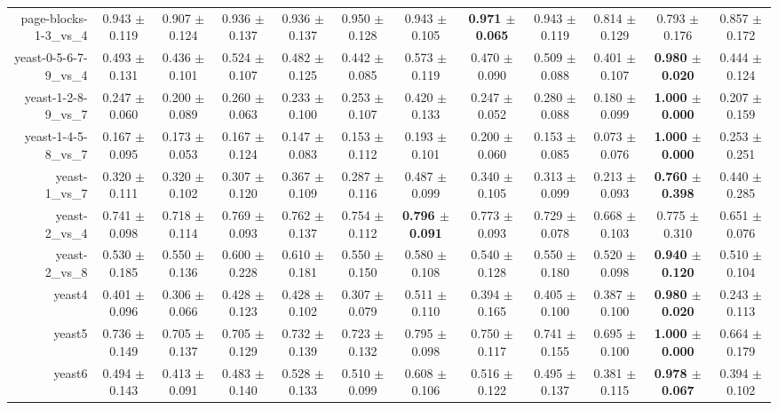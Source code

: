 \begin{table}[!ht]
{\begin{tabular}{r c c c c c c c c c c c}
page-blocks-1-3\_vs\_4 & 0.943 $\pm$ 0.119 & 0.907 $\pm$ 0.124 & 0.936 $\pm$ 0.137 & 0.936 $\pm$ 0.137 & 0.950 $\pm$ 0.128 & 0.943 $\pm$ 0.105 & \textbf{0.971 $\pm$ 0.065} & 0.943 $\pm$ 0.119 & 0.814 $\pm$ 0.129 & 0.793 $\pm$ 0.176 & 0.857 $\pm$ 0.172 \\
yeast-0-5-6-7-9\_vs\_4 & 0.493 $\pm$ 0.131 & 0.436 $\pm$ 0.101 & 0.524 $\pm$ 0.107 & 0.482 $\pm$ 0.125 & 0.442 $\pm$ 0.085 & 0.573 $\pm$ 0.119 & 0.470 $\pm$ 0.090 & 0.509 $\pm$ 0.088 & 0.401 $\pm$ 0.107 & \textbf{0.980 $\pm$ 0.020} & 0.444 $\pm$ 0.124 \\
yeast-1-2-8-9\_vs\_7 & 0.247 $\pm$ 0.060 & 0.200 $\pm$ 0.089 & 0.260 $\pm$ 0.063 & 0.233 $\pm$ 0.100 & 0.253 $\pm$ 0.107 & 0.420 $\pm$ 0.133 & 0.247 $\pm$ 0.052 & 0.280 $\pm$ 0.088 & 0.180 $\pm$ 0.099 & \textbf{1.000 $\pm$ 0.000} & 0.207 $\pm$ 0.159 \\
yeast-1-4-5-8\_vs\_7 & 0.167 $\pm$ 0.095 & 0.173 $\pm$ 0.053 & 0.167 $\pm$ 0.124 & 0.147 $\pm$ 0.083 & 0.153 $\pm$ 0.112 & 0.193 $\pm$ 0.101 & 0.200 $\pm$ 0.060 & 0.153 $\pm$ 0.085 & 0.073 $\pm$ 0.076 & \textbf{1.000 $\pm$ 0.000} & 0.253 $\pm$ 0.251 \\
yeast-1\_vs\_7 & 0.320 $\pm$ 0.111 & 0.320 $\pm$ 0.102 & 0.307 $\pm$ 0.120 & 0.367 $\pm$ 0.109 & 0.287 $\pm$ 0.116 & 0.487 $\pm$ 0.099 & 0.340 $\pm$ 0.105 & 0.313 $\pm$ 0.099 & 0.213 $\pm$ 0.093 & \textbf{0.760 $\pm$ 0.398} & 0.440 $\pm$ 0.285 \\
yeast-2\_vs\_4 & 0.741 $\pm$ 0.098 & 0.718 $\pm$ 0.114 & 0.769 $\pm$ 0.093 & 0.762 $\pm$ 0.137 & 0.754 $\pm$ 0.112 & \textbf{0.796 $\pm$ 0.091} & 0.773 $\pm$ 0.093 & 0.729 $\pm$ 0.078 & 0.668 $\pm$ 0.103 & 0.775 $\pm$ 0.310 & 0.651 $\pm$ 0.076 \\
yeast-2\_vs\_8 & 0.530 $\pm$ 0.185 & 0.550 $\pm$ 0.136 & 0.600 $\pm$ 0.228 & 0.610 $\pm$ 0.181 & 0.550 $\pm$ 0.150 & 0.580 $\pm$ 0.108 & 0.540 $\pm$ 0.128 & 0.550 $\pm$ 0.180 & 0.520 $\pm$ 0.098 & \textbf{0.940 $\pm$ 0.120} & 0.510 $\pm$ 0.104 \\
yeast4 & 0.401 $\pm$ 0.096 & 0.306 $\pm$ 0.066 & 0.428 $\pm$ 0.123 & 0.428 $\pm$ 0.102 & 0.307 $\pm$ 0.079 & 0.511 $\pm$ 0.110 & 0.394 $\pm$ 0.165 & 0.405 $\pm$ 0.100 & 0.387 $\pm$ 0.100 & \textbf{0.980 $\pm$ 0.020} & 0.243 $\pm$ 0.113 \\
yeast5 & 0.736 $\pm$ 0.149 & 0.705 $\pm$ 0.137 & 0.705 $\pm$ 0.129 & 0.732 $\pm$ 0.139 & 0.723 $\pm$ 0.132 & 0.795 $\pm$ 0.098 & 0.750 $\pm$ 0.117 & 0.741 $\pm$ 0.155 & 0.695 $\pm$ 0.100 & \textbf{1.000 $\pm$ 0.000} & 0.664 $\pm$ 0.179 \\
yeast6 & 0.494 $\pm$ 0.143 & 0.413 $\pm$ 0.091 & 0.483 $\pm$ 0.140 & 0.528 $\pm$ 0.133 & 0.510 $\pm$ 0.099 & 0.608 $\pm$ 0.106 & 0.516 $\pm$ 0.122 & 0.495 $\pm$ 0.137 & 0.381 $\pm$ 0.115 & \textbf{0.978 $\pm$ 0.067} & 0.394 $\pm$ 0.102 \\

\end{tabular}}
\end{table}
